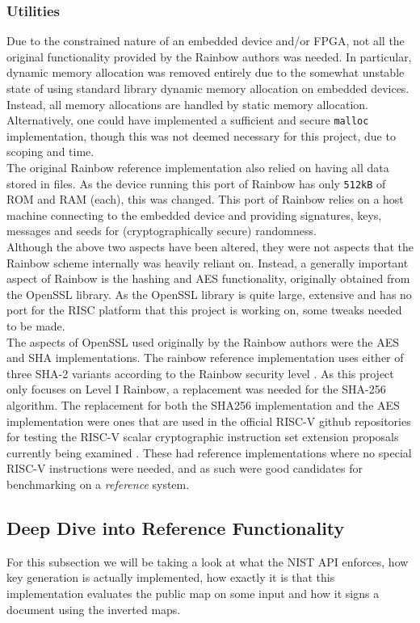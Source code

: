 \subsubsection{Utilities} \label{utils}
Due to the constrained nature of an embedded device and/or FPGA, not all the original functionality provided by the Rainbow authors was needed. In particular, dynamic memory allocation was removed entirely due to the somewhat unstable state of using standard library dynamic memory allocation on embedded devices. Instead, all memory allocations are handled by static memory allocation. Alternatively, one could have implemented a sufficient and secure \texttt{malloc} implementation, though this was not deemed necessary for this project, due to scoping and time.
\medskip\\
The original Rainbow reference implementation also relied on having all data stored in files. As the device running this port of Rainbow has only \texttt{512kB} of ROM and RAM (each), this was changed. This port of Rainbow relies on a host machine connecting to the embedded device and providing signatures, keys, messages and seeds for (cryptographically secure) randomness.
\medskip\\
Although the above two aspects have been altered, they were not aspects that the Rainbow scheme internally was heavily reliant on. Instead, a generally important aspect of Rainbow is the hashing and AES functionality, originally obtained from the OpenSSL library. As the OpenSSL library is quite large, extensive and has no port for the RISC platform that this project is working on, some tweaks needed to be made.
\medskip\\
The aspects of OpenSSL used originally by the Rainbow authors were the AES and SHA implementations. The rainbow reference implementation uses either of three SHA-2 variants according to the Rainbow security level \cite{rainbownist}. As this project only focuses on Level I Rainbow, a replacement was needed for the SHA-256 algorithm. The replacement for both the SHA256 implementation and the AES implementation were ones that are used in the official RISC-V github repositories for testing the RISC-V scalar cryptographic instruction set extension proposals currently being examined \cite{riscvcrypt}. These had reference implementations where no special RISC-V instructions were needed, and as such were good candidates for benchmarking on a \textit{reference} system.

\subsection{Deep Dive into Reference Functionality} \label{deepdive}
For this subsection we will be taking a look at what the NIST API enforces, how key generation is actually implemented, how exactly it is that this implementation evaluates the public map on some input and how it signs a document using the inverted maps.

